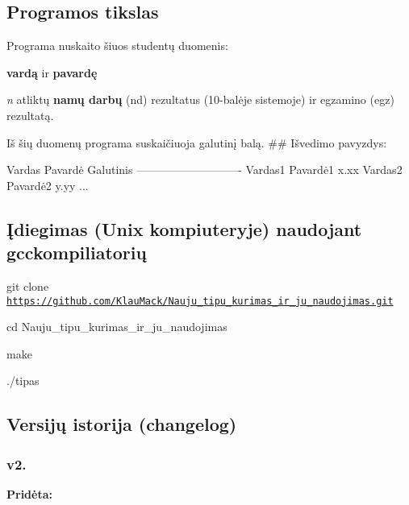 \subsection*{Programos tikslas}


\begin{DoxyItemize}
\item Programa nuskaito šiuos studentų duomenis\+:
\begin{DoxyItemize}
\item {\bfseries vardą} ir {\bfseries pavardę}
\item {\itshape n} atliktų {\bfseries namų darbų} ({\ttfamily nd}) rezultatus (10-\/balėje sistemoje) ir egzamino ({\ttfamily egz}) rezultatą.
\end{DoxyItemize}
\item Iš šių duomenų programa suskaičiuoja galutinį balą. \#\# Išvedimo pavyzdys\+: 
\begin{DoxyCode}
Vardas    Pavardė     Galutinis
----------------------------
Vardas1   Pavardė1    x.xx
Vardas2   Pavardė2    y.yy
...
\end{DoxyCode}
 \subsection*{Įdiegimas (Unix kompiuteryje) naudojant {\ttfamily gcc}kompiliatorių}
\end{DoxyItemize}


\begin{DoxyItemize}
\item {\ttfamily git clone \href{https://github.com/KlauMack/Nauju_tipu_kurimas_ir_ju_naudojimas.git}{\tt https\+://github.\+com/\+Klau\+Mack/\+Nauju\+\_\+tipu\+\_\+kurimas\+\_\+ir\+\_\+ju\+\_\+naudojimas.\+git}}
\item {\ttfamily cd Nauju\+\_\+tipu\+\_\+kurimas\+\_\+ir\+\_\+ju\+\_\+naudojimas}
\item {\ttfamily make}
\item {\ttfamily ./tipas} \subsection*{Versijų istorija (changelog)}
\end{DoxyItemize}

\subsubsection*{v2.}

{\bfseries Pridėta\+:}

